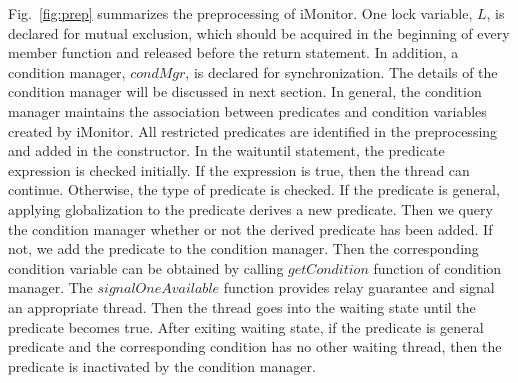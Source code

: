 \documentclass[preprint]{sigplanconf}
\begin{document}
Fig.~\ref{fig:prep} summarizes the preprocessing of iMonitor. One lock variable,
$L$, is declared for mutual exclusion, which should be acquired in the 
beginning of every member function and released before the return statement.
In addition, a condition manager, $condMgr$, is declared for 
synchronization. The details of the condition manager will be discussed in next
section. In general, the condition manager maintains the association between 
predicates and condition variables created by iMonitor. All restricted
predicates are identified in the preprocessing and added in the constructor. 
In the waituntil statement, the predicate expression is checked initially. If 
the expression is true, then the thread can continue. Otherwise, the type of
predicate is checked. If the predicate is general, applying globalization to 
the predicate derives a new predicate. Then we query the condition manager 
whether or not the derived predicate has been added. If not, we add the 
predicate to the condition manager. Then the corresponding condition variable
can be obtained by calling $getCondition$ function of condition manager. The
$signalOneAvailable$ function provides relay guarantee and signal an
appropriate thread. Then the thread goes into the waiting state until the
predicate becomes true. After exiting waiting state, if the predicate is
general predicate and the corresponding condition has no other waiting thread,
then the predicate is inactivated by the condition manager.

%
%
\end{document}
